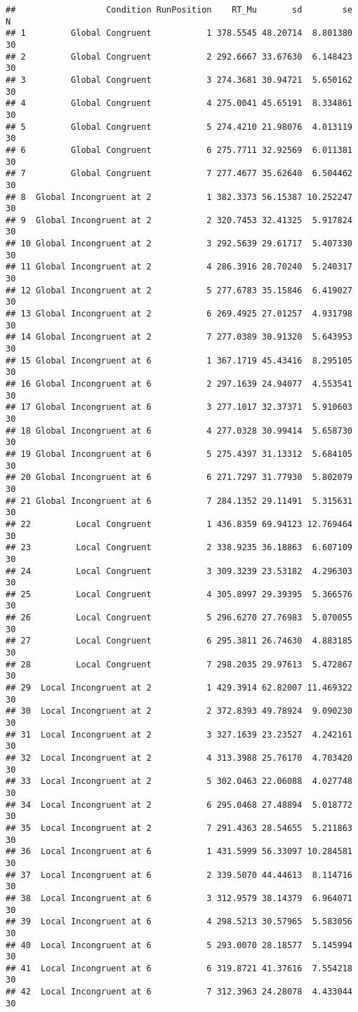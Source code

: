 \documentclass[
]{article}
\begin{document}
\begin{verbatim}
##                  Condition RunPosition    RT_Mu       sd        se  N
## 1         Global Congruent           1 378.5545 48.20714  8.801380 30
## 2         Global Congruent           2 292.6667 33.67630  6.148423 30
## 3         Global Congruent           3 274.3681 30.94721  5.650162 30
## 4         Global Congruent           4 275.0041 45.65191  8.334861 30
## 5         Global Congruent           5 274.4210 21.98076  4.013119 30
## 6         Global Congruent           6 275.7711 32.92569  6.011381 30
## 7         Global Congruent           7 277.4677 35.62640  6.504462 30
## 8  Global Incongruent at 2           1 382.3373 56.15387 10.252247 30
## 9  Global Incongruent at 2           2 320.7453 32.41325  5.917824 30
## 10 Global Incongruent at 2           3 292.5639 29.61717  5.407330 30
## 11 Global Incongruent at 2           4 286.3916 28.70240  5.240317 30
## 12 Global Incongruent at 2           5 277.6783 35.15846  6.419027 30
## 13 Global Incongruent at 2           6 269.4925 27.01257  4.931798 30
## 14 Global Incongruent at 2           7 277.0389 30.91320  5.643953 30
## 15 Global Incongruent at 6           1 367.1719 45.43416  8.295105 30
## 16 Global Incongruent at 6           2 297.1639 24.94077  4.553541 30
## 17 Global Incongruent at 6           3 277.1017 32.37371  5.910603 30
## 18 Global Incongruent at 6           4 277.0328 30.99414  5.658730 30
## 19 Global Incongruent at 6           5 275.4397 31.13312  5.684105 30
## 20 Global Incongruent at 6           6 271.7297 31.77930  5.802079 30
## 21 Global Incongruent at 6           7 284.1352 29.11491  5.315631 30
## 22         Local Congruent           1 436.8359 69.94123 12.769464 30
## 23         Local Congruent           2 338.9235 36.18863  6.607109 30
## 24         Local Congruent           3 309.3239 23.53182  4.296303 30
## 25         Local Congruent           4 305.8997 29.39395  5.366576 30
## 26         Local Congruent           5 296.6270 27.76983  5.070055 30
## 27         Local Congruent           6 295.3811 26.74630  4.883185 30
## 28         Local Congruent           7 298.2035 29.97613  5.472867 30
## 29  Local Incongruent at 2           1 429.3914 62.82007 11.469322 30
## 30  Local Incongruent at 2           2 372.8393 49.78924  9.090230 30
## 31  Local Incongruent at 2           3 327.1639 23.23527  4.242161 30
## 32  Local Incongruent at 2           4 313.3988 25.76170  4.703420 30
## 33  Local Incongruent at 2           5 302.0463 22.06088  4.027748 30
## 34  Local Incongruent at 2           6 295.0468 27.48894  5.018772 30
## 35  Local Incongruent at 2           7 291.4363 28.54655  5.211863 30
## 36  Local Incongruent at 6           1 431.5999 56.33097 10.284581 30
## 37  Local Incongruent at 6           2 339.5070 44.44613  8.114716 30
## 38  Local Incongruent at 6           3 312.9579 38.14379  6.964071 30
## 39  Local Incongruent at 6           4 298.5213 30.57965  5.583056 30
## 40  Local Incongruent at 6           5 293.0070 28.18577  5.145994 30
## 41  Local Incongruent at 6           6 319.8721 41.37616  7.554218 30
## 42  Local Incongruent at 6           7 312.3963 24.28078  4.433044 30
\end{verbatim}
\end{document}
